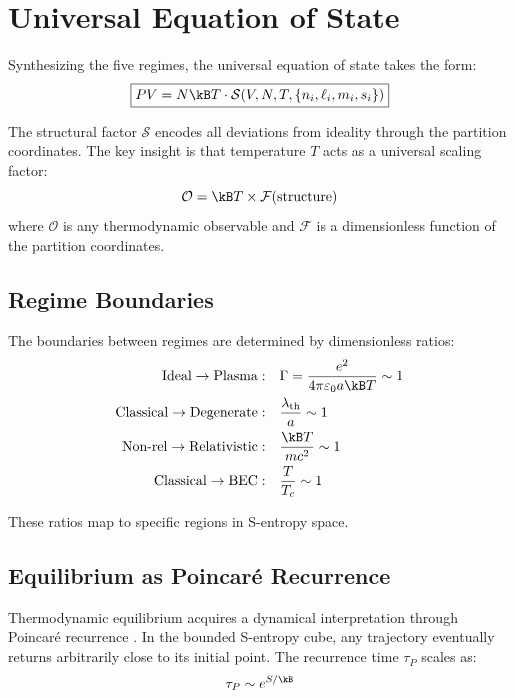 \section{Universal Equation of State}
\label{sec:eos}

Synthesizing the five regimes, the universal equation of state takes the form:
\begin{equation}
\boxed{PV = N\kB T \cdot \mathcal{S}(V, N, T, \{n_i, \ell_i, m_i, s_i\})}
\label{eq:universal}
\end{equation}

The structural factor $\mathcal{S}$ encodes all deviations from ideality through the partition coordinates. The key insight is that temperature $T$ acts as a universal scaling factor:
\begin{equation}
\mathcal{O} = \kB T \times \mathcal{F}(\text{structure})
\end{equation}
where $\mathcal{O}$ is any thermodynamic observable and $\mathcal{F}$ is a dimensionless function of the partition coordinates.

\subsection{Regime Boundaries}

The boundaries between regimes are determined by dimensionless ratios:
\begin{align}
\text{Ideal} \to \text{Plasma}: \quad & \Gamma = \frac{e^2}{4\pi\varepsilon_0 a\kB T} \sim 1 \\
\text{Classical} \to \text{Degenerate}: \quad & \frac{\lambda_{\text{th}}}{a} \sim 1 \\
\text{Non-rel} \to \text{Relativistic}: \quad & \frac{\kB T}{mc^2} \sim 1 \\
\text{Classical} \to \text{BEC}: \quad & \frac{T}{T_c} \sim 1
\end{align}

These ratios map to specific regions in S-entropy space.

\subsection{Equilibrium as Poincar\'{e} Recurrence}

Thermodynamic equilibrium acquires a dynamical interpretation through Poincar\'{e} recurrence \cite{poincare1890probleme, cornfeld1982ergodic}. In the bounded S-entropy cube, any trajectory eventually returns arbitrarily close to its initial point. The recurrence time $\tau_P$ scales as:
\begin{equation}
\tau_P \sim e^{S/\kB}
\end{equation}


